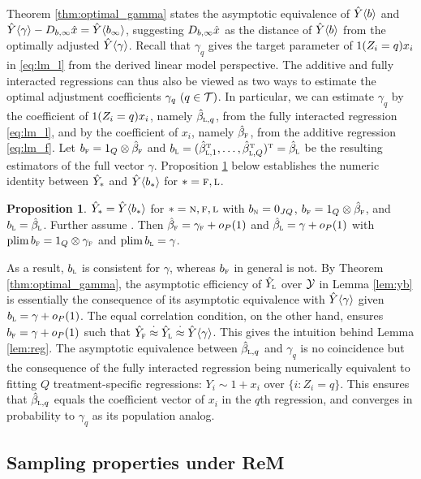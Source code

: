 \documentclass[11pt]{article}
\theoremstyle{definition}
\newtheorem{proposition}{Proposition}
\begin{document}
Theorem \ref{thm:optimal_gamma} states the asymptotic equivalence of $\hat Y\langle b \rangle$ and $\hat Y\langle\gamma\rangle -D_{b, \infty} \hat x = \hat Y\langle b_\infty \rangle$, suggesting $D_{b, \infty}\hat x$ as the distance of $\hat Y\langle b \rangle$ from the optimally adjusted $\hat Y\langle\gamma\rangle$.
Recall that  $\gamma_q$ gives the target parameter of $1(Z_i=q) x_i$ in \eqref{eq:lm_l} from the derived linear model perspective.  The additive and fully interacted regressions can thus also be viewed as two ways to estimate the optimal adjustment coefficients $\gamma_q \ (q\in\mathcal{T})$. 
In particular, we can estimate $\gamma_q$ by the \olss coefficient of $1(Z_i=q) x_i$, namely $\hat\beta_{\textsc{l},q}$, from the fully interacted regression \eqref{eq:lm_l}, and by the \olss coefficient of $x_i$, namely $\hat\beta_{\textsc{f}}$, from the additive regression \eqref{eq:lm_f}. 
%
 Let $ b_{\textsc{f}} = 1_Q  \otimes \hat\beta_{\textsc{f}} $ and $ b_{\textsc{l}}=  (\hat\beta_{\textsc{l},1}^{ \mathrm{\scriptscriptstyle T} }, \dots, \hat\beta_{\textsc{l},Q}^{ \mathrm{\scriptscriptstyle T} })^{ \mathrm{\scriptscriptstyle T} } = \hat\beta_{\textsc{l}}$ be the resulting estimators of the full vector $\gamma$. 
Proposition \ref{prop:numeric_corr} below
establishes the numeric identity between $\hat Y_*$ and $\hat Y\langle b_*\rangle $ for $* = \textsc{f}, \textsc{l}$. 

\begin{proposition}\label{prop:numeric_corr}
$\hat Y_* = \hat Y\langle b_*\rangle $ for $* = \textsc{n}, \textsc{f},\textsc{l}$ with $b_{\textsc{n}} = 0_{JQ}$, $b_{\textsc{f}} = 1_Q\otimes \hat\beta_{\textsc{f}}$, and $b_{\textsc{l}} = \hat\beta_{\textsc{l}}$.  
%
Further assume \creasym. Then 
$\hat\beta_{\textsc{f}} = \gamma_{\textsc{f}} + o_P(1)$ and $\hat\beta_{\textsc{l}} = \gamma + o_P(1)$ with $ \textup{plim\,} b_{\textsc{f}} =  1_Q\otimes \gamma_{\textsc{f}}$ and $\textup{plim\,} b_{\textsc{l}} =\gamma$. 
\end{proposition}

As a result, $b_{\textsc{l}}$ is consistent for $\gamma$, whereas
$b_{\textsc{f}}$ in general is not. 
By Theorem \ref{thm:optimal_gamma}, the asymptotic efficiency of $\hat Y_{\textsc{l}}$ over $\mathcal{Y}$ in Lemma \ref{lem:yb} is essentially the consequence of its asymptotic equivalence with $\hat Y\langle\gamma\rangle$ given $b_{\textsc{l}} = \gamma + o_P(1)$.
The equal correlation condition, on the other hand, ensures $b_{\textsc{f}} = \gamma + o_P(1)$ such that $\hat Y_{\textsc{f}}  \overset{\cdot}{\approx} \hat Y_{\textsc{l}}\overset{\cdot}{\approx} \hat Y\langle\gamma\rangle$.
This gives the intuition behind Lemma \ref{lem:reg}.  The asymptotic equivalence between $\hat\beta_{\textsc{l},q}$ and $\gamma_q$ is no coincidence but the consequence of the fully interacted regression being numerically equivalent to fitting $Q$ treatment-specific regressions: $Y_i \sim 1+x_i$ over $\{i: Z_i = q\}$. This ensures that $\hat\beta_{\textsc{l},q}$ equals the coefficient vector of $x_i$ in the $q$th regression, and converges in probability to $\gamma_q$ as its population analog.


\subsection{Sampling properties under ReM}\label{sec:rem_g}
\end{document}
